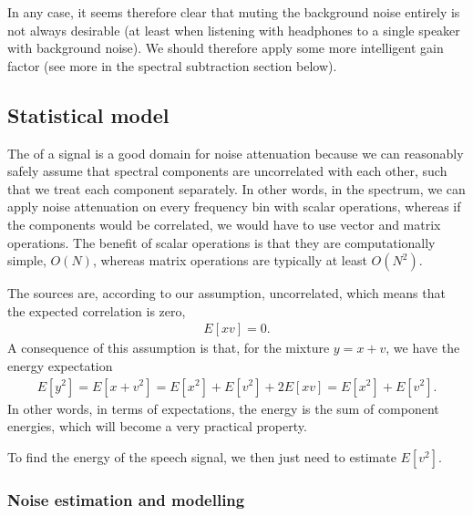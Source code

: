 \documentclass[letterpaper,10pt,english]{jupyterBook}
\begin{document}
\sphinxAtStartPar
In any case, it seems therefore clear that muting the background noise entirely is not always desirable (at least when listening with headphones to a single speaker with background noise). We should therefore apply some more intelligent gain factor (see more in the spectral subtraction section below).


\subsection{Statistical model}
\label{\detokenize{Enhancement/Noise_attenuation:statistical-model}}
\sphinxAtStartPar
The {\hyperref[\detokenize{Representations/Spectrogram_and_the_STFT::doc}]{}} of a signal is a good
domain for noise attenuation because we can reasonably safely assume
that spectral components are uncorrelated with each other, such that we
treat each component separately. In other words, in the spectrum, we can
apply noise attenuation on every frequency bin with scalar operations,
whereas if the components would be correlated, we would have to use
vector and matrix operations. The benefit of scalar operations is that
they are computationally simple, \(O(N)\), whereas matrix operations are
typically at least \(O(N^2)\).

\sphinxAtStartPar
The sources are, according to our assumption, uncorrelated, which
means that the expected correlation is zero,
\begin{equation*}
\begin{split}E[xv] = 0.\end{split}
\end{equation*}
\sphinxAtStartPar
A consequence of this assumption is that, for the mixture \(y = x + v\), we have the energy expectation
\begin{equation*}
\begin{split}E\left[y^2\right] = E\left[x+v^2\right] = E\left[x^2\right] + E\left[v^2\right] + 2E\left[xv\right]
= E\left[x^2\right] + E\left[v^2\right].\end{split}
\end{equation*}
\sphinxAtStartPar
In other words, in terms of expectations, the energy is the sum of component energies, which will become a very practical property.

\sphinxAtStartPar
To find the energy of the speech signal, we then just need to estimate \(E\left[v^2\right]\).


\subsubsection{Noise estimation and modelling}
\label{\detokenize{Enhancement/Noise_attenuation:noise-estimation-and-modelling}}
\end{document}
